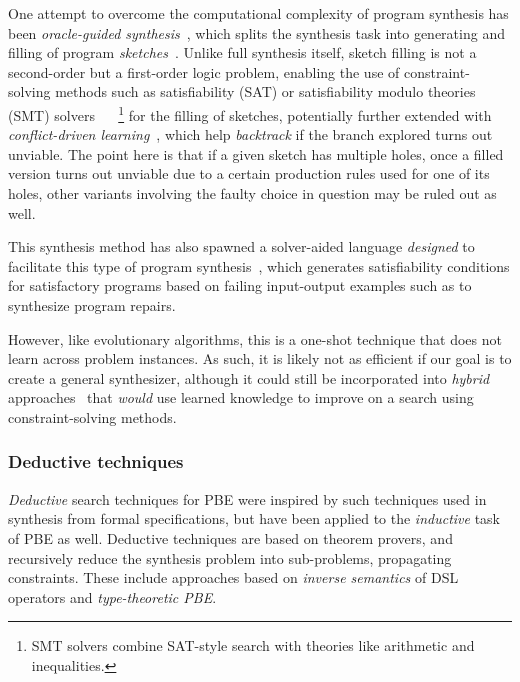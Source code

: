 \documentclass{article}
\begin{document}
One attempt to overcome the computational complexity of program synthesis
has been \emph{oracle-guided synthesis}~\citep{solar2008program},
which splits the synthesis task into generating and filling of program
\emph{sketches}~\citep{murali2017neural}.
Unlike full synthesis itself, sketch filling is not a second-order but a
first-order logic problem, enabling the use of constraint-solving methods
such as satisfiability (SAT) or satisfiability modulo theories (SMT) solvers%
~\citep{akiba2013calibrating,alur2013syntax,alur2016sygus,rosette,architecture}%
~\footnote{
    SMT solvers combine SAT-style search with theories like arithmetic and inequalities.
} for the filling of sketches, potentially further extended with
\emph{conflict-driven learning}~\citep{feng2018program,hornclauses},
which help \emph{backtrack} if the branch explored turns out unviable.
The point here is that if a given sketch has multiple holes,
once a filled version turns out unviable due to a certain production rules used for one of its holes,
other variants involving the faulty choice in question may be ruled out as well.

This synthesis method has also spawned a solver-aided language
\emph{designed} to facilitate this type of program synthesis~\citep{rosette},
which generates satisfiability conditions for satisfactory programs
based on failing input-output examples such as to synthesize program repairs.

However, like evolutionary algorithms, this is a one-shot technique
that does not learn across problem instances.
As such, it is likely not as efficient if our goal is to create a general synthesizer,
although it could still be incorporated into \emph{hybrid} approaches~\citep{deepcoder} that \emph{would} use learned knowledge to improve on a search using constraint-solving methods.

\subsubsection{Deductive techniques}

\emph{Deductive} search techniques for PBE were inspired by such
techniques used in synthesis from formal specifications,
but have been applied to the \emph{inductive} task of PBE as well.
Deductive techniques are based on theorem provers,
and recursively reduce the synthesis problem into sub-problems,
propagating constraints.
These include approaches based on \emph{inverse semantics} of
DSL operators and \emph{type-theoretic PBE}.
\end{document}
